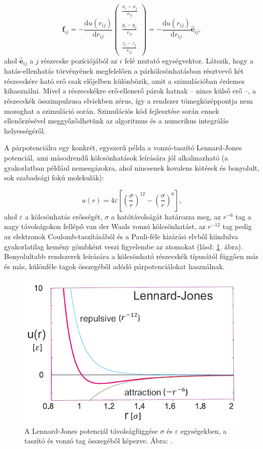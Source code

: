 \documentclass[12pt]{article}
\theoremstyle{plain}
\newcommand{\dd}{\textrm{d}}
\begin{document}
\begin{equation}
	\mathbf{f}_{ij} = -\frac{\dd u(r_{ij})}{\dd r_{ij}} \left( \begin{array}{c}
	\frac{x_i - x_j}{r_{ij}} \\ \\
	\frac{y_i - y_j}{r_{ij}} \\ \\
	\frac{z_i - z_j}{r_{ij}}
	\end{array}
	\right) = -\frac{\dd u(r_{ij})}{\dd r_{ij}} \hat{\mathbf{e}}_{ij},
\end{equation}
ahol $\hat{\mathbf{e}}_{ij}$ a $j$ részecske pozíciójából az $i$ felé mutató egységvektor. Látszik, hogy a hatás-ellenhatás törvényének megfelelően a párkölcsönhatásban résztvevő két részecskére ható erő csak előjelben különbözik, amit a szimulációban érdemes kihasználni. Mivel a részecskékre erő-ellenerő párok hatnak -- nincs külső erő --, a részecskék összimpulzusa elviekben zérus, így a rendszer tömegközéppontja nem mozoghat a szimuláció során. Szimulációs kód fejlesztése során ennek ellenőrzésével meggyőződhetünk az algoritmus és a numerikus integrálás helyességéről.

A párpotenciálra egy konkrét, egyszerű példa a vonzó-taszító Lennard-Jones potenciál, ami másodrendű kölcsönhatások leírására jól alkalmazható (a gyakorlatban például nemesgázokra, ahol nincsenek kovalens kötések és bonyolult, sok szabadsági fokú molekulák):

\begin{equation}
u(r) = 4\varepsilon \left[ \left(\frac{\sigma}{r}\right)^{12} - \left(\frac{\sigma}{r}\right)^{6} \right],
\end{equation}
ahol $\varepsilon$ a kölcsönhatás erősségét, $\sigma$ a hatótávolságát határozza meg, az $r^{-6}$ tag a nagy távolságokon fellépő van der Waals vonzó kölcsönhatást, az $r^{-12}$ tag pedig az elektronok Coulomb-taszításából és a Pauli-féle kizárási elvből kiindulva gyakorlatilag kemény gömbként veszi figyelembe az atomokat (lásd: \ref{fig:lj}. ábra). Bonyolultabb rendszerek leírására a kölcsönható részecskék típusától függően más és más, különféle tagok összegéből adódó párpotenciálokat használnak.


\begin{figure}
	\centering
	\includegraphics[width=0.7\linewidth]{media/LJ}
	\caption{A Lennard-Jones potenciál távolságfüggése $\sigma$ és $\varepsilon$ egységekben, a taszító és vonzó tag összegéből képezve. Ábra: \cite{Landau2012}.}
	\label{fig:lj}
\end{figure}
\end{document}
